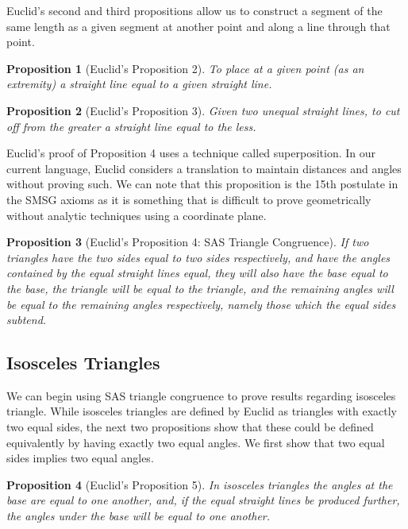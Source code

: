 \documentclass[
]{book}
\newtheorem{proposition}{Proposition}[chapter]
\theoremstyle{definition}
\theoremstyle{definition}
\theoremstyle{definition}
\theoremstyle{definition}
\theoremstyle{remark}
\begin{document}
Euclid's second and third propositions allow us to construct a segment of the same length as a given segment at another point and along a line through that point.

\begin{proposition}[Euclid's Proposition 2]
\protect\hypertarget{prp:prop2}{}\label{prp:prop2}To place at a given point (as an extremity) a straight line equal to a given straight line.
\end{proposition}

\begin{proposition}[Euclid's Proposition 3]
\protect\hypertarget{prp:prop3}{}\label{prp:prop3}Given two unequal straight lines, to cut off from the greater a straight line equal to the less.
\end{proposition}

Euclid's proof of Proposition 4 uses a technique called superposition. In our current language, Euclid considers a translation to maintain distances and angles without proving such. We can note that this proposition is the 15th postulate in the SMSG axioms as it is something that is difficult to prove geometrically without analytic techniques using a coordinate plane.

\begin{proposition}[Euclid's Proposition 4: SAS Triangle Congruence]
\protect\hypertarget{prp:prop4}{}\label{prp:prop4}If two triangles have the two sides equal to two sides respectively, and have the angles contained by the equal straight lines equal, they will also have the base equal to the base, the triangle will be equal to the triangle, and the remaining angles will be equal to the remaining angles respectively, namely those which the equal sides subtend.
\end{proposition}

\hypertarget{isosceles-triangles}{%
\subsection{Isosceles Triangles}\label{isosceles-triangles}}

We can begin using SAS triangle congruence to prove results regarding isosceles triangle. While isosceles triangles are defined by Euclid as triangles with exactly two equal sides, the next two propositions show that these could be defined equivalently by having exactly two equal angles. We first show that two equal sides implies two equal angles.

\begin{proposition}[Euclid's Proposition 5]
\protect\hypertarget{prp:prop5}{}\label{prp:prop5}In isosceles triangles the angles at the base are equal to one another, and, if the equal straight lines be produced further, the angles under the base will be equal to one another.
\end{proposition}
\end{document}
